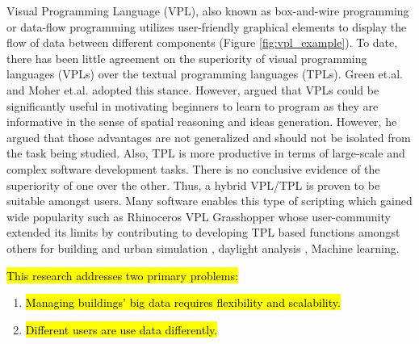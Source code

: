 \documentclass{scsSimAUDPaperFormat}
\begin{document}
Visual Programming Language (VPL), also known as box-and-wire programming or data-flow programming utilizes user-friendly graphical elements to display the flow of data between different components (Figure \ref{fig:vpl_example}). To date, there has been little agreement on the superiority of visual programming languages (VPLs) over the textual programming languages (TPLs). Green et.al. \cite{PDFConjecture} and Moher et.al. \cite{Moher1993ComparingPrograms} adopted this stance. However, \cite{MENZIES2002EVALUATIONLANGUAGES} argued that VPLs could be significantly useful in motivating beginners to learn to program as they are informative in the sense of spatial reasoning and ideas generation. However, he argued that those advantages are not generalized and should not be isolated from the task being studied. Also, TPL is more productive in terms of large-scale and complex software development tasks. There is no conclusive evidence of the superiority of one over the other. Thus, a hybrid VPL/TPL is proven to be suitable amongst users. Many software enables this type of scripting which gained wide popularity such as Rhinoceros VPL Grasshopper\cite{Bachman2017Grasshopper:3D,2011bGrasshopperRhino} whose user-community extended its limits by contributing to developing TPL based functions amongst others for building and urban simulation \cite{RoudsariLadybug:Design, PeronatoIntegratingCitySim,Koltsova2011ComponentsGeometry}, daylight analysis \cite{JakubiecDIVAENERGYPLUS,LagiosANIMATEDRADIANCE/DAYSIM}, Machine learning\cite{Abdelrahman2017EnhancingLanguage,Abdelrahman2019ANT:Development}.

\hl{This research addresses two primary problems:}
\begin{enumerate}
    \item \hl{Managing buildings' big data requires flexibility and scalability.}
    \item \hl{Different users are use data differently.}
\end{enumerate} 
\end{document}
